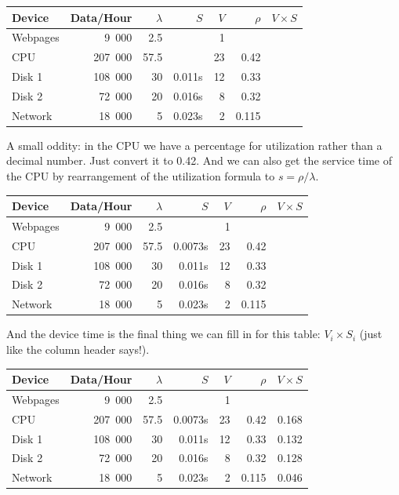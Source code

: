 \documentclass[a4paper]{report}
\begin{document}
\begin{center}
\begin{tabular}{l|r|r|r|r|r|r} 
	\textbf{Device} & \textbf{Data/Hour} & \textbf{$\lambda$} & \textbf{$S$} & \textbf{$V$} & \textbf{$\rho$} & \textbf{$V \times S$} \\ \hline
	Webpages & 9~000 & 2.5 & & 1 & & \\ \hline
	CPU & 207~000 & 57.5 &  & 23 & 0.42 & \\ \hline
	Disk 1 & 108~000 & 30 & 0.011s  & 12& 0.33 &\\ \hline
	Disk 2 & 72~000 & 20 & 0.016s & 8 & 0.32 &\\ \hline
	Network & 18~000 & 5 & 0.023s & 2 & 0.115 &
\end{tabular}
\end{center}

A small oddity: in the CPU we have a percentage for utilization rather than a decimal number. Just convert it to 0.42. And we can also get the service time of the CPU by rearrangement of the utilization formula to $s = \rho / \lambda$.

\begin{center}
\begin{tabular}{l|r|r|r|r|r|r} 
	\textbf{Device} & \textbf{Data/Hour} & \textbf{$\lambda$} & \textbf{$S$} & \textbf{$V$} & \textbf{$\rho$} & \textbf{$V \times S$} \\ \hline
	Webpages & 9~000 & 2.5 & & 1 & & \\ \hline
	CPU & 207~000 & 57.5 & 0.0073s & 23 & 0.42 & \\ \hline
	Disk 1 & 108~000 & 30 & 0.011s  & 12& 0.33 &\\ \hline
	Disk 2 & 72~000 & 20 & 0.016s & 8 & 0.32 &\\ \hline
	Network & 18~000 & 5 & 0.023s & 2 & 0.115 &
\end{tabular}
\end{center}

And the device time is the final thing we can fill in for this table: $V_{i} \times S_{i}$ (just like the column header says!).

\begin{center}
\begin{tabular}{l|r|r|r|r|r|r}
	\textbf{Device} & \textbf{Data/Hour} & \textbf{$\lambda$} & \textbf{$S$} & \textbf{$V$} & \textbf{$\rho$} & \textbf{$V \times S$} \\ \hline
	Webpages & 9~000 & 2.5 & & 1 & & \\ \hline
	CPU & 207~000 & 57.5 & 0.0073s & 23 & 0.42 & 0.168\\ \hline
	Disk 1 & 108~000 & 30 & 0.011s  & 12& 0.33 & 0.132\\ \hline
	Disk 2 & 72~000 & 20 & 0.016s & 8 & 0.32 & 0.128\\ \hline
	Network & 18~000 & 5 & 0.023s & 2 & 0.115 & 0.046
\end{tabular}
\end{center}
\end{document}
